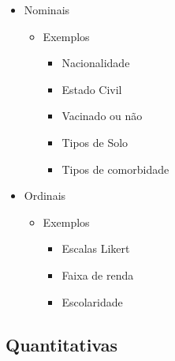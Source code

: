 \documentclass[
  letterpaper,
  DIV=11,
  numbers=noendperiod]{scrreprt}
\providecommand{\tightlist}{%
  \setlength{\itemsep}{0pt}\setlength{\parskip}{0pt}}\usepackage{longtable,booktabs,array}
\begin{document}
\begin{itemize}
\tightlist
\item
  Nominais

  \begin{itemize}
  \tightlist
  \item
    Exemplos

    \begin{itemize}
    \tightlist
    \item
      Nacionalidade
    \item
      Estado Civil
    \item
      Vacinado ou não
    \item
      Tipos de Solo
    \item
      Tipos de comorbidade
    \end{itemize}
  \end{itemize}
\item
  Ordinais

  \begin{itemize}
  \tightlist
  \item
    Exemplos

    \begin{itemize}
    \tightlist
    \item
      Escalas Likert
    \item
      Faixa de renda
    \item
      Escolaridade
    \end{itemize}
  \end{itemize}
\end{itemize}

\hypertarget{quantitativas}{%
\subsection{Quantitativas}\label{quantitativas}}
\end{document}

